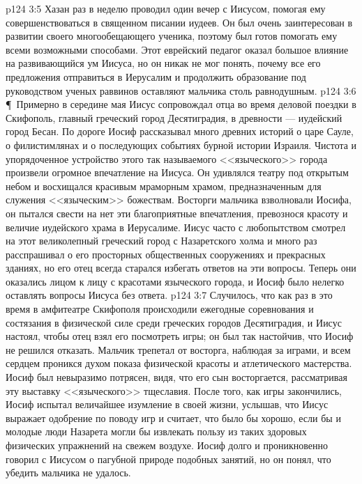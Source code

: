\vs p124 3:5 Хазан раз в неделю проводил один вечер с Иисусом, помогая ему совершенствоваться в священном писании иудеев. Он был очень заинтересован в развитии своего многообещающего ученика, поэтому был готов помогать ему всеми возможными способами. Этот еврейский педагог оказал большое влияние на развивающийся ум Иисуса, но он никак не мог понять, почему все его предложения отправиться в Иерусалим и продолжить образование под руководством ученых раввинов оставляют мальчика столь равнодушным.
\vs p124 3:6 \P\ Примерно в середине мая Иисус сопровождал отца во время деловой поездки в Скифополь, главный греческий город Десятиградия, в древности --- иудейский город Бесан. По дороге Иосиф рассказывал много древних историй о царе Сауле, о филистимлянах и о последующих событиях бурной истории Израиля. Чистота и упорядоченное устройство этого так называемого <<языческого>> города произвели огромное впечатление на Иисуса. Он удивлялся театру под открытым небом и восхищался красивым мраморным храмом, предназначенным для служения <<языческим>> божествам. Восторги мальчика взволновали Иосифа, он пытался свести на нет эти благоприятные впечатления, превознося красоту и величие иудейского храма в Иерусалиме. Иисус часто с любопытством смотрел на этот великолепный греческий город с Назаретского холма и много раз расспрашивал о его просторных общественных сооружениях и прекрасных зданиях, но его отец всегда старался избегать ответов на эти вопросы. Теперь они оказались лицом к лицу с красотами языческого города, и Иосиф было нелегко оставлять вопросы Иисуса без ответа.
\vs p124 3:7 Случилось, что как раз в это время в амфитеатре Скифополя происходили ежегодные соревнования и состязания в физической силе среди греческих городов Десятиградия, и Иисус настоял, чтобы отец взял его посмотреть игры; он был так настойчив, что Иосиф не решился отказать. Мальчик трепетал от восторга, наблюдая за играми, и всем сердцем проникся духом показа физической красоты и атлетического мастерства. Иосиф был невыразимо потрясен, видя, что его сын восторгается, рассматривая эту выставку <<языческого>> тщеславия. После того, как игры закончились, Иосиф испытал величайшее изумление в своей жизни, услышав, что Иисус выражает одобрение по поводу игр и считает, что было бы хорошо, если бы и молодые люди Назарета могли бы извлекать пользу из таких здоровых физических упражнений на свежем воздухе. Иосиф долго и проникновенно говорил с Иисусом о пагубной природе подобных занятий, но он понял, что убедить мальчика не удалось.

